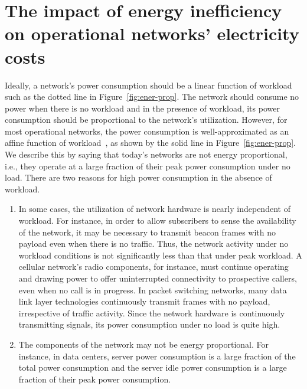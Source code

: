 \section{The impact of energy inefficiency on operational networks' electricity costs} 

Ideally, a network's power consumption should be a linear function of workload such as the dotted line in Figure~\ref{fig:ener-prop}. The network should consume no power when there is no workload and in the presence of workload, its power consumption should be proportional to the network's utilization. However, for most operational networks, the power consumption is well-approximated as an affine function of workload~\cite{Peng:2011:TPS:2030613.2030628,Fan:power:ICSA:2007}, as shown by the solid line in Figure~\ref{fig:ener-prop}. We describe this by saying that today's networks are not energy proportional, i.e., they operate at a large fraction of their peak power consumption under no load. There are two reasons for high power consumption in the absence of workload. 
\begin{enumerate}
\item In some cases, the utilization of network hardware is nearly independent of workload. For instance, in order to allow subscribers to sense the availability of the network, it may be necessary to transmit beacon frames with no payload even when there is no traffic. Thus, the network activity under no workload conditions is not significantly less than that under peak workload. A cellular network's radio components, for instance, must continue operating and drawing power to offer uninterrupted connectivity to prospective callers, even when no call is in progress. In packet switching networks, many data link layer technologies continuously transmit frames with no payload, irrespective of traffic activity. Since the network hardware is continuously transmitting signals, its power consumption under no load is quite high.
\item The components of the network may not be energy proportional. For instance, in data centers, server power consumption is a large fraction of the total power consumption and the server idle power consumption is a large fraction of their peak power consumption. 
\end{enumerate}

